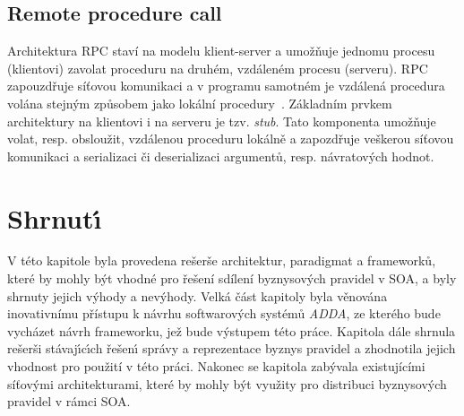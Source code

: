 \subsection{Remote procedure call}\label{sec:rpc}

Architektura \gls{RPC} staví na modelu klient-server a umožňuje jednomu procesu (klientovi)
zavolat proceduru na druhém, vzdáleném procesu (serveru).
\gls{RPC} zapouzdřuje síťovou komunikaci a v programu samotném
je vzdálená procedura volána stejným způsobem jako lokální procedury~\cite{nelson1981remote}. Základním
prvkem architektury na klientovi i na serveru je tzv. \textit{stub}. Tato komponenta
umožňuje volat, resp. obsloužit, vzdálenou proceduru lokálně a zapozdřuje veškerou
síťovou komunikaci a serializaci či deserializaci argumentů, resp. návratových hodnot.

\section{Shrnut\'{\i}}

V této kapitole byla provedena rešerše architektur, paradigmat a frameworků, které by mohly být vhodné
pro řešení sdílení byznysových pravidel v \gls{SOA}, a byly shrnuty jejich v\'yhody a nev\'yhody.
Velká část kapitoly byla věnována inovativnímu přístupu k návrhu softwarov\'ych systémů \textit{ADDA},
ze kterého bude vycházet návrh frameworku, jež bude výstupem této práce.
Kapitola dále shrnula rešerši stávaj\'{\i}c\'{\i}ch řešen\'{\i} správy a reprezentace byznys pravidel
a zhodnotila jejich vhodnost pro použití v této práci. Nakonec se kapitola zabývala existujícími
síťovými architekturami, které by mohly být využity pro distribuci byznysových pravidel v rámci \gls{SOA}.
